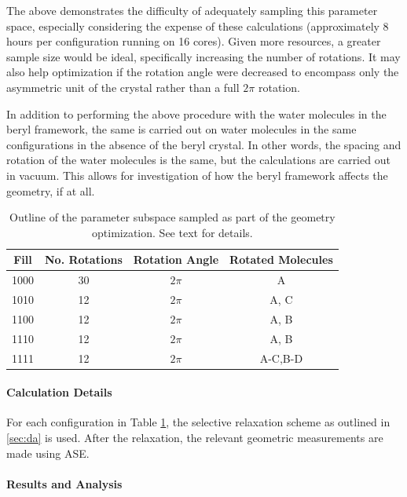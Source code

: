     The above demonstrates the difficulty of adequately sampling this parameter space, especially considering the expense of these calculations (approximately 8 hours per configuration running on 16 cores). Given more resources, a greater sample size would be ideal, specifically increasing the number of rotations. It may also help optimization if the rotation angle were decreased to encompass only the asymmetric unit of the crystal rather than a full $2\pi$ rotation.
    
    In addition to performing the above procedure with the water molecules in the beryl framework, the same is carried out on water molecules in the same configurations in the absence of the beryl crystal. In other words, the spacing and rotation of the water molecules is the same, but the calculations are carried out in vacuum. This allows for investigation of how the beryl framework affects the geometry, if at all.
    
    \begin{table}[]
        \centering
        \begin{tabular}{c|c|c|c}
            Fill & No. Rotations & Rotation Angle  & Rotated Molecules  \\
            \hline
            \hline
            1000 & 30 & $2\pi$ & A \\
            1010 & 12 & $2\pi$ & A, C \\
            1100 & 12 & $2\pi$ & A, B \\
            1110 & 12 & $2\pi$ & A, B \\
            1111 & 12 & $2\pi$ & A-C,B-D \\
        \end{tabular}
        \caption{Outline of the parameter subspace sampled as part of the geometry optimization. See text for details.}
        \label{tab:param_subspace}
    \end{table}
        
        \paragraph{Calculation Details}
        
        For each configuration in Table \ref{tab:param_subspace}, the selective relaxation scheme as outlined in \ref{sec:da} is used. After the relaxation, the relevant geometric measurements are made using ASE. 
        
        \paragraph{Results and Analysis}
        \label{sec:geom_opt}
        
